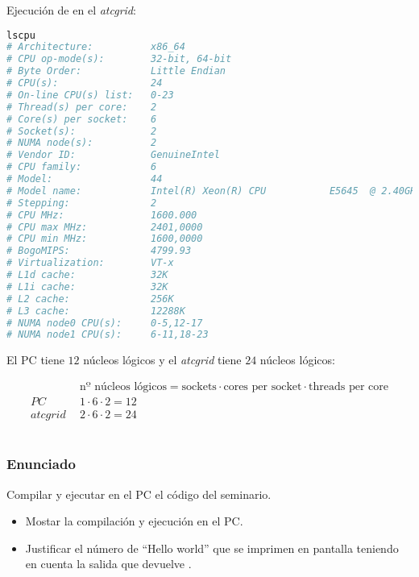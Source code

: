 \pagebreak

Ejecución de  en el \textit{atcgrid}:

\begin{lstlisting}[language=sh]
lscpu
# Architecture:          x86_64
# CPU op-mode(s):        32-bit, 64-bit
# Byte Order:            Little Endian
# CPU(s):                24
# On-line CPU(s) list:   0-23
# Thread(s) per core:    2
# Core(s) per socket:    6
# Socket(s):             2
# NUMA node(s):          2
# Vendor ID:             GenuineIntel
# CPU family:            6
# Model:                 44
# Model name:            Intel(R) Xeon(R) CPU           E5645  @ 2.40GHz
# Stepping:              2
# CPU MHz:               1600.000
# CPU max MHz:           2401,0000
# CPU min MHz:           1600,0000
# BogoMIPS:              4799.93
# Virtualization:        VT-x
# L1d cache:             32K
# L1i cache:             32K
# L2 cache:              256K
# L3 cache:              12288K
# NUMA node0 CPU(s):     0-5,12-17
# NUMA node1 CPU(s):     6-11,18-23
\end{lstlisting}

El PC tiene $12$ núcleos lógicos y el \textit{atcgrid} tiene $24$ núcleos lógicos:

\[\begin{split}
           & \text{nº núcleos lógicos}=\text{sockets}\cdot\text{cores per socket}\cdot\text{threads per core}\\
PC\ \      & 1\cdot6\cdot2=12 \\
\textit{atcgrid}\ \ & 2\cdot6\cdot2=24
\end{split}\]

\section{}\label{ej1-2}

\subsubsection{Enunciado}

Compilar y ejecutar en el PC el código  del seminario.

\begin{itemize}
	\item Mostar la compilación y ejecución en el PC\@.
	\item Justificar el número de ``Hello world'' que se imprimen en pantalla teniendo en cuenta la salida que devuelve .
\end{itemize}

